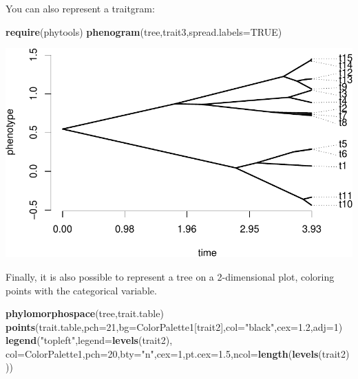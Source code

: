 \documentclass[
]{book}
\newenvironment{Shaded}{\begin{snugshade}}{\end{snugshade}}
\newcommand{\AttributeTok}[1]{\textcolor[rgb]{0.13,0.29,0.53}{#1}}
\newcommand{\ConstantTok}[1]{\textcolor[rgb]{0.56,0.35,0.01}{#1}}
\newcommand{\DecValTok}[1]{\textcolor[rgb]{0.00,0.00,0.81}{#1}}
\newcommand{\FloatTok}[1]{\textcolor[rgb]{0.00,0.00,0.81}{#1}}
\newcommand{\FunctionTok}[1]{\textcolor[rgb]{0.13,0.29,0.53}{\textbf{#1}}}
\newcommand{\NormalTok}[1]{#1}
\newcommand{\StringTok}[1]{\textcolor[rgb]{0.31,0.60,0.02}{#1}}
\begin{document}
You can also represent a traitgram:

\begin{Shaded}
\begin{Highlighting}[]
\FunctionTok{require}\NormalTok{(phytools)}
\FunctionTok{phenogram}\NormalTok{(tree,trait3,}\AttributeTok{spread.labels=}\ConstantTok{TRUE}\NormalTok{)}
\end{Highlighting}
\end{Shaded}

\includegraphics{pcm-workshop_files/figure-latex/traitgram-1.pdf}

Finally, it is also possible to represent a tree on a 2-dimensional plot, coloring points with the categorical variable.

\begin{Shaded}
\begin{Highlighting}[]
\FunctionTok{phylomorphospace}\NormalTok{(tree,trait.table)}
\FunctionTok{points}\NormalTok{(trait.table,}\AttributeTok{pch=}\DecValTok{21}\NormalTok{,}\AttributeTok{bg=}\NormalTok{ColorPalette1[trait2],}\AttributeTok{col=}\StringTok{"black"}\NormalTok{,}\AttributeTok{cex=}\FloatTok{1.2}\NormalTok{,}\AttributeTok{adj=}\DecValTok{1}\NormalTok{)}
\FunctionTok{legend}\NormalTok{(}\StringTok{"topleft"}\NormalTok{,}\AttributeTok{legend=}\FunctionTok{levels}\NormalTok{(trait2),}
       \AttributeTok{col=}\NormalTok{ColorPalette1,}\AttributeTok{pch=}\DecValTok{20}\NormalTok{,}\AttributeTok{bty=}\StringTok{"n"}\NormalTok{,}\AttributeTok{cex=}\DecValTok{1}\NormalTok{,}\AttributeTok{pt.cex=}\FloatTok{1.5}\NormalTok{,}\AttributeTok{ncol=}\FunctionTok{length}\NormalTok{(}\FunctionTok{levels}\NormalTok{(trait2)))}
\end{Highlighting}
\end{Shaded}
\end{document}
